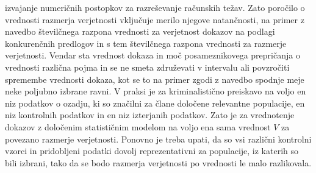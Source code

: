 \documentclass[12pt,a4paper]{amsart}
\theoremstyle{definition} %
\theoremstyle{plain} %
\begin{document}
izvajanje numeričnih postopkov za razreševanje računskih težav. Zato poročilo o vrednosti razmerja verjetnosti vključuje merilo njegove natančnosti, na primer z
navedbo številčnega razpona vrednosti za verjetnost dokazov na podlagi konkurenčnih predlogov in s tem številčnega razpona vrednosti za razmerje verjetnosti.
Vendar sta vrednost dokaza in moč posameznikovega prepričanja o vrednosti različna pojma in se ne smeta združevati v intervalu ali povzročiti spremembe
vrednosti dokaza, kot se to na primer zgodi z navedbo spodnje meje neke poljubno izbrane ravni. V praksi je za kriminalistično preiskavo na voljo en niz
podatkov o ozadju, ki so značilni za člane določene relevantne populacije, en niz kontrolnih podatkov in en niz izterjanih podatkov. Zato je za vrednotenje
dokazov z določenim statističnim modelom na voljo ena sama vrednost $V$ za povezano razmerje verjetnosti. Ponovno je treba upati, da so vsi različni kontrolni
vzorci in pridobljeni podatki dovolj reprezentativni za populacije, iz katerih so bili izbrani, tako da se bodo razmerja verjetnosti po vrednosti le malo
razlikovala.

\end{document}
